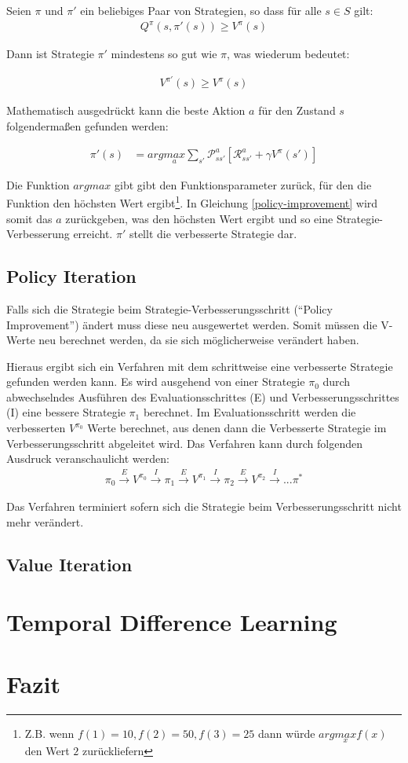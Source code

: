 \documentclass[10pt]{scrartcl}
\begin{document}
Seien $\pi$ und $\pi'$ ein beliebiges Paar von Strategien, so dass für alle $s \in S$ gilt:
\begin{align}
Q^\pi(s,\pi'(s)) \ge V^\pi(s)
\end{align}

Dann ist Strategie $\pi'$  mindestens so gut wie $\pi$, was wiederum bedeutet:

\begin{align}
V^{\pi'}(s) \ge V^\pi(s)
\end{align}

Mathematisch ausgedrückt kann die beste Aktion $a$ für den Zustand $s$ folgendermaßen gefunden werden:

\begin{align}\label{policy-improvement}
\pi'(s) &= arg\underset{a}{max}\sum_{s'}\mathcal{P}^a_{ss'}[\mathcal{R}^a_{ss'}+\gamma V^\pi(s')]
\end{align}

Die Funktion $argmax$ gibt gibt den Funktionsparameter zurück, für den die Funktion den höchsten Wert ergibt\footnote{Z.B. wenn $f(1)=10, f(2) = 50, f(3) = 25$ dann würde $arg\underset{x}{max}f(x)$ den Wert $2$ zurückliefern}. In Gleichung \ref{policy-improvement} wird somit das $a$ zurückgeben, was den höchsten Wert ergibt und so eine Strategie-Verbesserung erreicht. $\pi'$ stellt die verbesserte Strategie dar.

\subsection{Policy Iteration}
Falls sich die Strategie beim Strategie-Verbesserungsschritt (``Policy Improvement'') ändert muss diese neu ausgewertet werden. Somit müssen die V-Werte neu berechnet werden, da sie sich möglicherweise verändert haben.

Hieraus ergibt sich ein Verfahren mit dem schrittweise eine verbesserte Strategie gefunden werden kann. Es wird ausgehend von einer Strategie $\pi_0$ durch abwechselndes Ausführen des Evaluationsschrittes (E) und Verbesserungsschrittes (I) eine bessere Strategie $\pi_1$ berechnet. Im Evaluationsschritt werden die verbesserten $V^{\pi_0}$ Werte berechnet, aus denen dann die Verbesserte Strategie im Verbesserungsschritt abgeleitet wird. Das Verfahren kann durch  folgenden Ausdruck veranschaulicht werden:
\begin{align}
\pi_0 \overset{E}{\longrightarrow} V^{\pi_0} \overset{I}{\longrightarrow} \pi_1 \overset{E}{\longrightarrow} V^{\pi_1} \overset{I}{\longrightarrow} \pi_2  \overset{E}{\longrightarrow} V^{\pi_2} \overset{I}{\longrightarrow} ... \pi^*
\end{align}

Das Verfahren terminiert sofern sich die Strategie beim Verbesserungsschritt nicht mehr verändert.

\subsection{Value Iteration}

\section{Temporal Difference Learning}

\section{Fazit}
\end{document}
